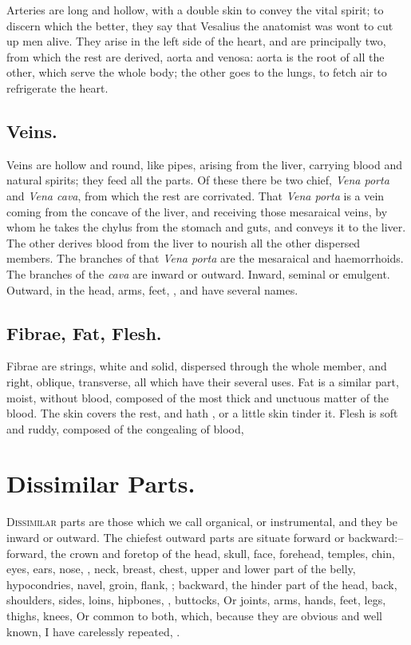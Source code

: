 Arteries are long and hollow, with a double skin to convey the vital spirit; to
discern which the better, they say that Vesalius the anatomist was wont to cut
up men alive. They arise in the left side of the heart, and
are principally two, from which the rest are derived, aorta and venosa: aorta
is the root of all the other, which serve the whole body; the other goes to the
lungs, to fetch air to refrigerate the heart.

\subsection{Veins.}

Veins are hollow and round, like pipes, arising from the liver, carrying blood
and natural spirits; they feed all the parts. Of these there be two chief,
\emph{Vena porta} and \emph{Vena cava}, from which the rest are corrivated.
That \emph{Vena porta} is a vein coming from the concave of the liver, and
receiving those mesaraical veins, by whom he takes the chylus from the stomach
and guts, and conveys it to the liver. The other derives blood from the liver
to nourish all the other dispersed members. The branches of that \emph{Vena
porta} are the mesaraical and haemorrhoids. The branches of the \emph{cava} are
inward or outward. Inward, seminal or emulgent. Outward, in the head, arms,
feet, \etc{}, and have several names.

\subsection{Fibrae, Fat, Flesh.}

Fibrae are strings, white and solid, dispersed through the whole member, and
right, oblique, transverse, all which have their several uses. Fat is a similar
part, moist, without blood, composed of the most thick and unctuous matter of
the blood. The skin covers the rest, and hath
, or a little skin tinder it. Flesh is soft and ruddy, composed
of the congealing of blood, \etc{}

\section{Dissimilar Parts.}

\lettrine{D}{issimilar} parts are those which we call organical, or
instrumental, and they be inward or outward. The chiefest outward parts are
situate forward or backward:--forward, the crown and foretop of the head,
skull, face, forehead, temples, chin, eyes, ears, nose, \etc{}, neck, breast,
chest, upper and lower part of the belly, hypocondries, navel, groin, flank,
\etc{}; backward, the hinder part of the head, back, shoulders, sides, loins,
hipbones, , buttocks, \etc{} Or joints, arms, hands, feet, legs,
thighs, knees, \etc{} Or common to both, which, because they are obvious and
well known, I have carelessly repeated, .

